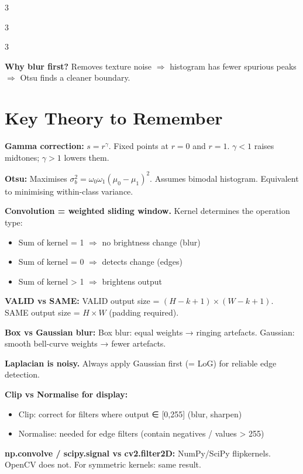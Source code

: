 \documentclass[9pt,landscape,a4paper]{extarticle}
\begin{document}
\begin{multicols*}{3}
\begin{multicols*}{3}
\begin{multicols}{3}
\begin{tipbox}
\textbf{Why blur first?} Removes texture noise $\Rightarrow$ histogram has fewer
spurious peaks $\Rightarrow$ Otsu finds a cleaner boundary.
\end{tipbox}

\section{Key Theory to Remember}

\textbf{Gamma correction:}
$s = r^\gamma$. Fixed points at $r=0$ and $r=1$.
$\gamma < 1$ raises midtones; $\gamma > 1$ lowers them.

\textbf{Otsu:} Maximises $\sigma_b^2 = \omega_0\omega_1(\mu_0-\mu_1)^2$.
Assumes bimodal histogram. Equivalent to minimising within-class variance.

\textbf{Convolution = weighted sliding window.} Kernel determines the operation type:
\begin{itemize}
  \item Sum of kernel = 1 $\Rightarrow$ no brightness change (blur)
  \item Sum of kernel = 0 $\Rightarrow$ detects change (edges)
  \item Sum of kernel > 1 $\Rightarrow$ brightens output
\end{itemize}

\textbf{VALID vs SAME:}
VALID output size = $(H - k + 1) \times (W - k + 1)$.
SAME output size = $H \times W$ (padding required).

\textbf{Box vs Gaussian blur:}
Box blur: equal weights → ringing artefacts.
Gaussian: smooth bell-curve weights → fewer artefacts.

\textbf{Laplacian is noisy.}
Always apply Gaussian first (= LoG) for reliable edge detection.

\textbf{Clip vs Normalise for display:}
\begin{itemize}
  \item Clip: correct for filters where output ∈ [0,255] (blur, sharpen)
  \item Normalise: needed for edge filters (contain negatives / values > 255)
\end{itemize}

\textbf{np.convolve / scipy.signal vs cv2.filter2D:}
NumPy/SciPy flipkernels. OpenCV does not. For symmetric kernels: same result.


\end{multicols}
\end{multicols*}
\end{multicols*}
\end{document}
